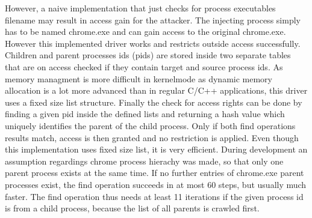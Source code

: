 However, a naive implementation that just checks for process executables filename may result in access gain for the attacker. The  injecting process simply has to be named chrome.exe and can gain access to the original chrome.exe. However this implemented driver works and restricts outside access successfully. Children and parent processes ids (pids) are stored inside two separate tables that are on access checked if they contain target and source process ids. As memory managment is more difficult in kernelmode as dynamic memory allocation is a lot more advanced than in regular C/C++ applications, this driver uses a fixed size list structure. Finally the check for access rights can be done by finding a given pid inside the defined lists and returning a hash value which uniquely identifies the parent of the child process. Only if both find operations results match, access is then granted and no restriction is applied. Even though this implementation uses fixed size list, it is very efficient. During development an assumption regardings chrome process hierachy was made, so that only one parent process exists at the same time. If no further entries of chrome.exe parent processes exist, the find operation succeeds in at most 60 steps, but usually much faster. The find operation thus needs at least 11 iterations if the given process id is from a child process, because the list of all parents is crawled first.